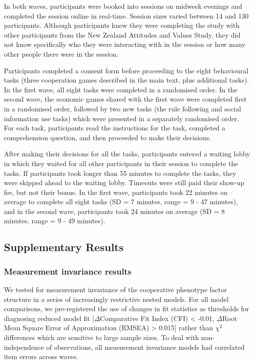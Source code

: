 \documentclass[
  man,floatsintext]{apa6}
\begin{document}
In both waves, participants were booked into sessions on midweek evenings and
completed the session online in real-time. Session sizes varied between 14 and
130 participants. Although participants knew they were completing the study with
other participants from the New Zealand Attitudes and Values Study, they did not
know specifically who they were interacting with in the session or how many
other people there were in the session.

Participants completed a consent form before proceeding to the eight
behavioural tasks (three cooperation games described in the main text, plus
additional tasks). In the first wave, all eight tasks were completed in a
randomised order. In the second wave, the economic games shared with the first
wave were completed first in a randomised order, followed by two new tasks (the
rule following and social information use tasks) which were presented in a
separately randomised order. For each task, participants read the instructions
for the task, completed a comprehension question, and then proceeded to make
their decisions.

After making their decisions for all the tasks, participants entered a waiting
lobby in which they waited for all other participants in their session to
complete the tasks. If participants took longer than 55 minutes to complete the
tasks, they were skipped ahead to the waiting lobby. Timeouts were still paid
their show-up fee, but not their bonus. In the first wave, participants took
22 minutes on average to
complete all eight tasks (SD =
7 minutes, range =
9 -
47
minutes), and in the second wave, participants took
24
minutes on average (SD = 8
minutes, range = 9 -
49 minutes).

\newpage

\hypertarget{supplementary-results}{%
\subsection{Supplementary Results}\label{supplementary-results}}

\hypertarget{measurement-invariance-results}{%
\subsubsection{Measurement invariance results}\label{measurement-invariance-results}}

We tested for measurement invariance of the cooperative phenotype factor
structure in a series of increasingly restrictive nested models. For all model
comparisons, we pre-registered the use of changes in fit statistics as
thresholds for diagnosing reduced model fit
{[}\(\Delta\)Comparative Fit Index (CFI) \textless{} -0.01, \(\Delta\)Root Mean Square Error of
Approximation (RMSEA) \textgreater{} 0.015{]} rather than \(\chi^2\) differences which are
sensitive to large sample sizes. To deal with non-independence of observations,
all measurement invariance models had correlated item errors across waves.
\end{document}
